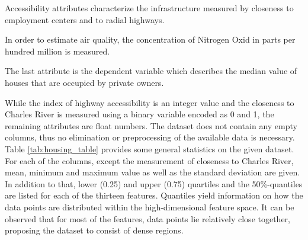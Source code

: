 Accessibility attributes characterize the infrastructure measured by closeness to employment centers and to radial highways. 

In order to estimate air quality, the concentration of Nitrogen Oxid in parts per hundred million is measured. 

The last attribute is the dependent variable which describes the median value of houses that are occupied by private owners. 

While the index of highway accessibility is an integer value and the closeness to Charles River is measured using a binary variable encoded as 0 and 1, the remaining attributes are float numbers. The dataset does not contain any empty columns, thus no elimination or preprocessing of the available data is necessary.\newline
Table \ref{tab:housing_table} provides some general statistics on the given dataset. For each of the columns, except the measurement of closeness to Charles River, mean, minimum and maximum value as well as the standard deviation are given. In addition to that, lower (0.25) and upper (0.75) quartiles and the 50\%-quantiles are listed for each of the thirteen features. Quantiles yield information on how the data points are distributed within the high-dimensional feature space. It can be observed that for most of the features, data points lie relatively close together, proposing the dataset to consist of dense regions. 


